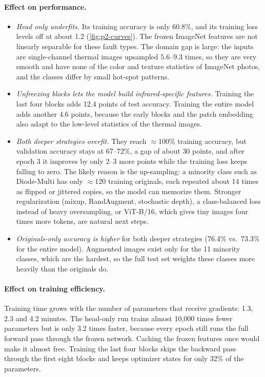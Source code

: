 \paragraph{Effect on performance.}
\begin{itemize}[nosep,leftmargin=*]
  \item \emph{Head only underfits.} Its training accuracy is only 60.8\%, and its training loss levels off at about 1.2 (\cref{fig:p2-curves}). The frozen ImageNet features are not linearly separable for these fault types. The domain gap is large: the inputs are single-channel thermal images upsampled 5.6--9.3 times, so they are very smooth and have none of the color and texture statistics of ImageNet photos, and the classes differ by small hot-spot patterns.
  \item \emph{Unfreezing blocks lets the model build infrared-specific features.} Training the last four blocks adds 12.4 points of test accuracy. Training the entire model adds another 4.6 points, because the early blocks and the patch embedding also adapt to the low-level statistics of the thermal images.
  \item \emph{Both deeper strategies overfit.} They reach $\approx$100\% training accuracy, but validation accuracy stays at 67--72\%, a gap of about 30 points, and after epoch 3 it improves by only 2--3 more points while the training loss keeps falling to zero. The likely reason is the up-sampling: a minority class such as Diode-Multi has only $\approx$120 training originals, each repeated about 14 times as flipped or jittered copies, so the model can memorize them. Stronger regularization (mixup, RandAugment, stochastic depth), a class-balanced loss instead of heavy oversampling, or ViT-B/16, which gives tiny images four times more tokens, are natural next steps.
  \item \emph{Originals-only accuracy is higher} for both deeper strategies (76.4\% vs.\ 73.3\% for the entire model). Augmented images exist only for the 11 minority classes, which are the hardest, so the full test set weights these classes more heavily than the originals do.
\end{itemize}

\paragraph{Effect on training efficiency.}
Training time grows with the number of parameters that receive gradients: 1.3, 2.3 and 4.2 minutes.
The head-only run trains almost 10{,}000 times fewer parameters but is only 3.2 times faster, because every epoch still runs the full forward pass through the frozen network.
Caching the frozen features once would make it almost free.
Training the last four blocks skips the backward pass through the first eight blocks and keeps optimizer states for only 32\% of the parameters.


